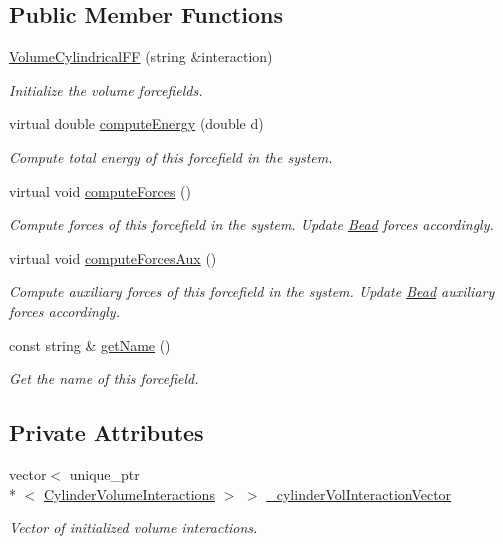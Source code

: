 \subsection*{Public Member Functions}
\begin{DoxyCompactItemize}
\item 
\hyperlink{classVolumeCylindricalFF_a803cbed635525100015efc8094e1bf11}{Volume\+Cylindrical\+F\+F} (string \&interaction)
\begin{DoxyCompactList}\small\item\em Initialize the volume forcefields. \end{DoxyCompactList}\item 
virtual double \hyperlink{classVolumeCylindricalFF_ab5ddebdb54f582dfd07d6cf82e92a78b}{compute\+Energy} (double d)
\begin{DoxyCompactList}\small\item\em Compute total energy of this forcefield in the system. \end{DoxyCompactList}\item 
virtual void \hyperlink{classVolumeCylindricalFF_a777849c01725bdc05562df0961c85f25}{compute\+Forces} ()
\begin{DoxyCompactList}\small\item\em Compute forces of this forcefield in the system. Update \hyperlink{classBead}{Bead} forces accordingly. \end{DoxyCompactList}\item 
virtual void \hyperlink{classVolumeCylindricalFF_a26fe078612a7fb4ff7d82e9235cd72e7}{compute\+Forces\+Aux} ()
\begin{DoxyCompactList}\small\item\em Compute auxiliary forces of this forcefield in the system. Update \hyperlink{classBead}{Bead} auxiliary forces accordingly. \end{DoxyCompactList}\item 
const string \& \hyperlink{classForceField_a4a09e09603b4c4650dc7b3b0f0912fd2}{get\+Name} ()
\begin{DoxyCompactList}\small\item\em Get the name of this forcefield. \end{DoxyCompactList}\end{DoxyCompactItemize}
\subsection*{Private Attributes}
\begin{DoxyCompactItemize}
\item 
vector$<$ unique\+\_\+ptr\\*
$<$ \hyperlink{classCylinderVolumeInteractions}{Cylinder\+Volume\+Interactions} $>$ $>$ \hyperlink{classVolumeCylindricalFF_acb78c1fd7c964a6fe658b498ae91b44f}{\+\_\+cylinder\+Vol\+Interaction\+Vector}
\begin{DoxyCompactList}\small\item\em Vector of initialized volume interactions. \end{DoxyCompactList}\end{DoxyCompactItemize}


